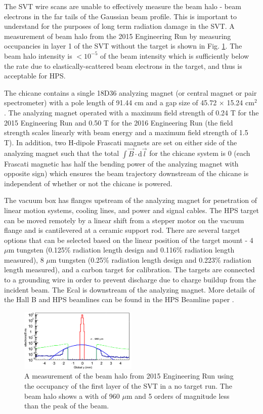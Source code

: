 The SVT wire scans are unable to effectively measure the beam halo - beam electrons in the far tails of the Gaussian beam profile. This is important to understand for the purposes of long term radiation damage in the SVT. A measurement of beam halo from the 2015 Engineering Run by measuring occupancies in layer 1 of the SVT without the target is shown in Fig. \ref{fig:beamtails}. The beam halo intensity is $< 10^{-5}$ of the beam intensity which is sufficiently below the rate due to elastically-scattered beam electrons in the target, and thus is acceptable for HPS.

The chicane contains a single 18D36 analyzing magnet (or central magnet or pair spectrometer) with a pole length of 91.44 cm and a gap size of 45.72 $\times$ 15.24 cm$^2$. The analyzing magnet operated with a maximum field strength of 0.24 T for the 2015 Engineering Run and 0.50 T for the 2016 Engineering Run (the field strength scales linearly with beam energy and a maximum field strength of 1.5 T). In addition, two H-dipole Frascati magnets are set on either side of the analyzing magnet such that the total $\int \vec{B} \cdot \mathrm{d}\vec{l}$ for the chicane system is 0 (each Frascati magnetic has half the bending power of the analyzing magnet with opposite sign) which ensures the beam trajectory downstream of the chicane is independent of whether or not the chicane is powered. 

The vacuum box has flanges upstream of the analyzing magnet for penetration of linear motion systems, cooling lines, and power and signal cables. The HPS target can be moved remotely by a linear shift from a stepper motor on the vacuum flange and is cantilevered at a ceramic support rod. There are several target options that can be selected based on the linear position of the target mount - 4 $\mu$m tungsten (0.125\% radiation length design and 0.116\% radiation length measured), 8 $\mu$m tungsten (0.25\% radiation length design and 0.223\% radiation length measured), and a carbon target for calibration. The targets are connected to a grounding wire in order to prevent discharge due to charge buildup from the incident beam. The Ecal is downstream of the analyzing magnet. More details of the Hall B and HPS beamlines can be found in the HPS Beamline paper \cite{BALTZELL201769}.

\begin{figure}
    \centering
    \includegraphics[width=0.5\textwidth]{figs/detector/beamtails.jpg}
    \caption{A measurement of the beam halo from 2015 Engineering Run using the occupancy of the first layer of the SVT in a no target run. The beam halo shows a with of 960 $\mu$m and 5 orders of magnitude less than the peak of the beam.}
    \label{fig:beamtails}
\end{figure}

